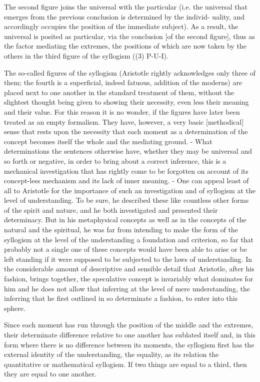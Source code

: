 The second figure joins the universal with the particular (i.e. the universal
that emerges from the previous conclusion is determined by the individ-
uality, and accordingly occupies the position of the immediate subject).
As a result, the universal is posited as particular, via the conclusion [of the
second figure], thus as the factor mediating the extremes, the positions of
which are now taken by the others in the third figure of the syllogism
((3) P-U-I).

The so-called figures of the syllogism
(Aristotle rightly acknowledges only three of them;
the fourth is a superficial, indeed fatuous, addition of the moderns)
are placed next to one another in the standard treatment of them,
without the slightest thought being given to showing their necessity,
even less their meaning and their value.
For this reason it is no wonder, if the figures have later been
treated as an empty formalism. They have, however, a very basic
[methodical] sense that rests upon the necessity that each moment as
a determination of the concept becomes itself the whole and the
mediating ground. - What determinations the sentences otherwise
have, whether they may be universal and so forth or negative,
in order to bring about a correct inference, this is a mechanical
investigation that has rightly come to be forgotten on account of
its concept-less mechanism and its lack of inner meaning. - One
can appeal least of all to Aristotle for the importance of such an
investigation and of syllogism at the level of understanding. To be
sure, he described these like countless other forms of the spirit and
nature, and he both investigated and presented their determinacy.
But in his metaphysical concepts as well as in the concepts of the
natural and the spiritual, he was far from intending to make the
form of the syllogism at the level of the understanding a foundation
and criterion, so far that probably not a single one of these concepts
would have been able to arise or be left standing if it were supposed
to be subjected to the laws of understanding. In the considerable
amount of descriptive and sensible detail that
Aristotle, after his fashion, brings together, the speculative concept is
invariably what dominates for him and he does not allow that
inferring at the level of mere understanding, the inferring that he
first outlined in so determinate a fashion, to enter into this sphere.

Since each moment has run through the position of the middle and the
extremes, their determinate difference relative to one another has sublated
itself and, in this form where there is no difference between its moments, the
syllogism first has the external identity of the understanding, the equality,
as its relation the quantitative or mathematical syllogism. If
two things are equal to a third, then they are equal to one another.

